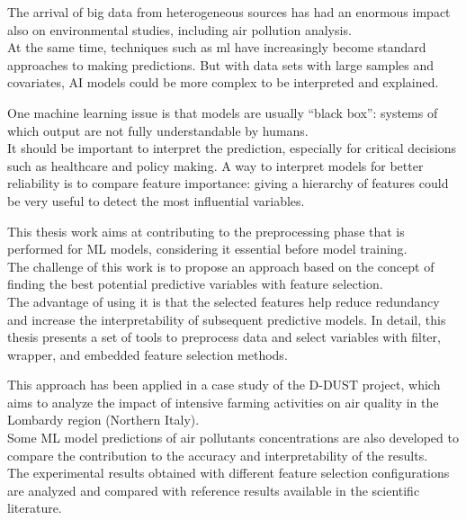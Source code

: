 The arrival of big data from heterogeneous sources has had an enormous impact also on environmental studies, including air pollution analysis.\\
At the same time, techniques such as \gls{ml} have increasingly become standard approaches to making predictions. But with data sets with large samples and covariates, AI models could be more complex to be interpreted and explained.\par
One machine learning issue is that models are usually “black box”: systems of which output are not fully understandable by humans. \\
It should be important to interpret the prediction, especially for critical decisions such as healthcare and policy making.
A way to interpret models for better reliability is to compare feature importance: giving a hierarchy of features could be very useful to detect the most influential variables.\par
This thesis work aims at contributing to the preprocessing phase that is performed for ML models, considering it essential before model training.\\
The challenge of this work is to propose an approach based on the concept of finding the best potential predictive variables with feature selection.\\
The advantage of using it is that the selected features help reduce redundancy and increase the interpretability of subsequent predictive models.
In detail, this thesis presents a set of tools to preprocess data and select variables with filter, wrapper, and embedded feature selection methods.\par
This approach has been applied in a case study of the D-DUST project, which aims to analyze the impact of intensive farming activities on air quality in the Lombardy region (Northern Italy).\\
Some ML model predictions of air pollutants concentrations are also developed to compare the contribution to the accuracy and interpretability of the results.\\
The experimental results obtained with different feature selection configurations are analyzed and compared with reference results available in the scientific literature.
\\
\\